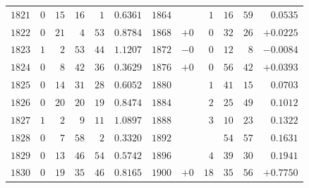 \begin{center}
{{\begin{minipage}{.96\linewidth}
\begin{tabular}{r|rrrr|r||r|rrrr|r}
$1821$ & $0$ & $15$ & $16$ & $1$ & $0.6361$ & $1864$ &  & $1$ & $16$ & $59$ & $0.0535$\\
$1822$ & $0$ & $21$ & $4$ & $53$ & $0.8784$ & $1868$ & $+0$ & $0$ & $32$ & $26$ & $+0.0225$\\
$1823$ & $1$ & $2$ & $53$ & $44$ & $1.1207$ & $1872$ & $-0$ & $0$ & $12$ & $8$ & $-0.0084$\\
$1824$ & $0$ & $8$ & $42$ & $36$ & $0.3629$ & $1876$ & $+0$ & $0$ & $56$ & $42$ & $+0.0393$\\
$1825$ & $0$ & $14$ & $31$ & $28$ & $0.6052$ & $1880$ &  & $1$ & $41$ & $15$ & $0.0703$\\[3pt]
$1826$ & $0$ & $20$ & $20$ & $19$ & $0.8474$ & $1884$ &  & $2$ & $25$ & $49$ & $0.1012$\\
$1827$ & $1$ & $2$ & $9$ & $11$ & $1.0897$ & $1888$ &  & $3$ & $10$ & $23$ & $0.1322$\\
$1828$ & $0$ & $7$ & $58$ & $2$ & $0.3320$ & $1892$ &  &  & $54$ & $57$ & $0.1631$\\
$1829$ & $0$ & $13$ & $46$ & $54$ & $0.5742$ & $1896$ &  & $4$ & $39$ & $30$ & $0.1941$\\
$1830$ & $0$ & $19$ & $35$ & $46$ & $0.8165$ & $1900$ & $+0$ & $18$ & $35$ & $56$ & $+0.7750$\\
\end{tabular}
\endgroup
\end{minipage}}}\endgroup
\end{center}
\clearpage
{}%
